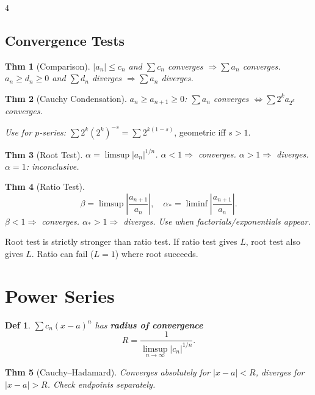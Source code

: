 \documentclass[9pt,landscape]{extarticle}
\theoremstyle{compact}
\newtheorem*{thm}{Thm}
\newtheorem*{defn}{Def}
\newenvironment{keyfact}{%
  \smallskip\noindent{\color{MidnightBlue}\bfseries Key fact:}\enspace\ignorespaces
}{\smallskip}
\begin{document}
\begin{multicols}{4}
\subsection{Convergence Tests}
\begin{thm}[Comparison]
$|a_n| \leq c_n$ and $\sum c_n$ converges $\Rightarrow \sum a_n$ converges. \\
$a_n \geq d_n \geq 0$ and $\sum d_n$ diverges $\Rightarrow \sum a_n$ diverges.
\end{thm}

\begin{thm}[Cauchy Condensation]
$a_n \geq a_{n+1} \geq 0$: $\sum a_n$ converges $\Leftrightarrow \sum 2^k a_{2^k}$ converges.
\end{thm}
\textit{Use for $p$-series:} $\sum 2^k (2^k)^{-s} = \sum 2^{k(1-s)}$, geometric iff $s > 1$.

\begin{thm}[Root Test]
$\alpha = \limsup |a_n|^{1/n}$. $\alpha < 1 \Rightarrow$ converges. $\alpha > 1 \Rightarrow$ diverges. $\alpha = 1$: inconclusive.
\end{thm}

\begin{thm}[Ratio Test]
$$\beta = \limsup\left|\frac{a_{n+1}}{a_n}\right|, \quad \alpha_* = \liminf\left|\frac{a_{n+1}}{a_n}\right|.$$
$\beta < 1 \Rightarrow$ converges. $\alpha_* > 1 \Rightarrow$ diverges. Use when factorials/exponentials appear.
\end{thm}

\begin{keyfact}
Root test is strictly stronger than ratio test. If ratio test gives $L$, root test also gives $L$. Ratio can fail ($L=1$) where root succeeds.
\end{keyfact}

\section{Power Series}

\begin{defn}
$\sum c_n(x-a)^n$ has \textbf{radius of convergence}
$$R = \frac{1}{\limsup_{n\to\infty}|c_n|^{1/n}}.$$
\end{defn}

\begin{thm}[Cauchy--Hadamard]
Converges absolutely for $|x-a| < R$, diverges for $|x-a| > R$. Check endpoints separately.
\end{thm}


\end{multicols}
\end{document}
